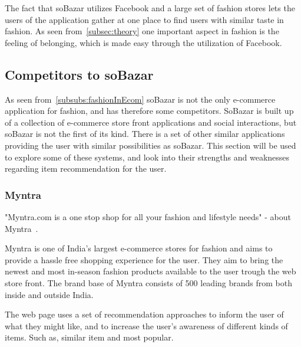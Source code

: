   The fact that soBazar utilizes Facebook and a large set of fashion stores lets the users of the application gather at one place to find users with similar taste in fashion.
  As seen from~\ref{subsec:theory} one important aspect in fashion is the feeling of belonging, which is made easy through the utilization of Facebook.

\subsection{Competitors to soBazar}


    As seen from~\ref{subsubs:fashionInEcom} soBazar is not the only e-commerce application for fashion, and has therefore some competitors.
    SoBazar is built up of a collection of e-commerce store front applications and social interactions, but soBazar is not the first of its kind.
    There is a set of other similar applications providing the user with similar possibilities as soBazar.
    This section will be used to explore some of these systems, and look into their strengths and weaknesses regarding item recommendation for the user.

\subsubsection{Myntra} %
\label{par:myntra}
    "Myntra.com is a one stop shop for all your fashion and lifestyle needs" - about Myntra~\cite{myntra}.

    Myntra is one of India's largest e-commerce stores for fashion and aims to  provide a hassle free shopping experience for the user.
    They aim to bring the newest and most in-season fashion products available to the user trough the web store front.
    The brand base of Myntra consists of 500 leading brands from both inside and outside India.

    The web page uses a set of recommendation approaches to inform the user of what they might like, and to increase the user's awareness of different kinds of items. Such as, similar item and most popular.
    
